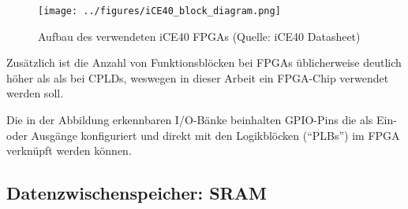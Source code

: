 \begin{figure}[htbp]
	\centering
		\texttt{[image: ../figures/iCE40\_block\_diagram.png]}
	\caption[Blockdiagramm des verwendeten iCE40 FPGAs]{Aufbau des verwendeten iCE40 FPGAs (Quelle: iCE40 Datasheet{\cite{doc:datasheet}})}
	\label{fig:ice40_block_diagram}
\end{figure}

Zusätzlich ist die Anzahl von Funktionsblöcken bei FPGAs üblicherweise deutlich höher als als bei CPLDs, weswegen in dieser Arbeit ein FPGA-Chip verwendet werden soll.

Die in der Abbildung erkennbaren I/O-Bänke beinhalten GPIO-Pins die als Ein- oder Ausgänge konfiguriert und direkt mit den Logikblöcken (``PLBs'') im FPGA verknüpft werden können.

\subsection{Datenzwischenspeicher: SRAM}

